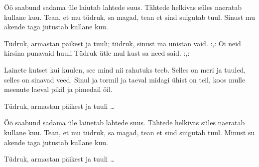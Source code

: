 \"O\"o saabund sadama \"ule
laiutab lahtede suus.
T\"ahtede helkivas s\"ules
naeratab kullane kuu.
Tean, et mu t\"udruk, sa magad,
tean et sind suigutab tuul.
Sinust mu akende taga
jutustab kullane kuu.

T\"udruk, armastan p\"aikest ja tuuli;
t\"udruk, sinust ma unistan vaid.
:,: Oi neid kirsina punavaid huuli
T\"udruk \"utle mul kust sa need said. :,:

Lainete kutset kui kuulen,
see mind nii rahutuks teeb.
Selles on meri ja tuuled,
selles on sinavad veed.
Sinul ja tormil ja taeval
midagi \"uhist on teil,
koos mulle meenute laeval
pikil ja pimedail \"oil.

T\"udruk, armastan p\"aikest ja tuuli \ldots

\clearpage \"O\"o saabund sadama \"ule
lainetab lahtede suus.
T\"ahtede helkivas s\"ules
naeratab kullane kuu.
Tean, et mu t\"udruk, sa magad,
tean et sind suigutab tuul.
Minust su akende taga
jutustab kullane kuu.

T\"udruk, armastan p\"aikest ja tuuli \ldots